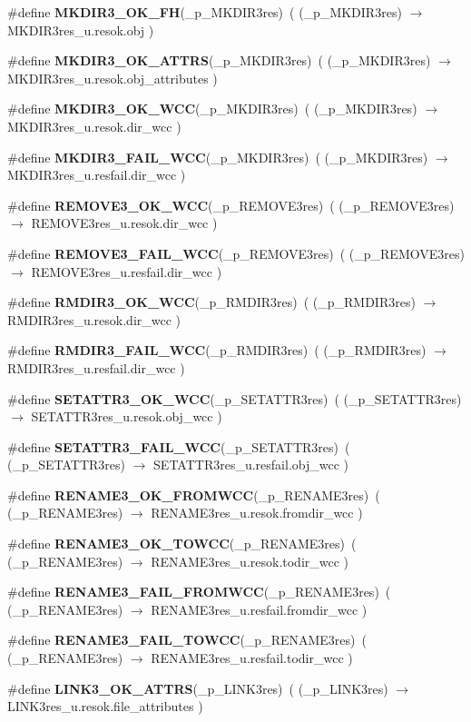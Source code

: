 \begin{CompactItemize}
\item 
\#define {\bf MKDIR3\_\-OK\_\-FH}(\_\-p\_\-MKDIR3res)\ ( (\_\-p\_\-MKDIR3res) $\rightarrow$ MKDIR3res\_\-u.resok.obj )
\item 
\#define {\bf MKDIR3\_\-OK\_\-ATTRS}(\_\-p\_\-MKDIR3res)\ ( (\_\-p\_\-MKDIR3res) $\rightarrow$ MKDIR3res\_\-u.resok.obj\_\-attributes )
\item 
\#define {\bf MKDIR3\_\-OK\_\-WCC}(\_\-p\_\-MKDIR3res)\ ( (\_\-p\_\-MKDIR3res) $\rightarrow$ MKDIR3res\_\-u.resok.dir\_\-wcc )
\item 
\#define {\bf MKDIR3\_\-FAIL\_\-WCC}(\_\-p\_\-MKDIR3res)\ ( (\_\-p\_\-MKDIR3res) $\rightarrow$ MKDIR3res\_\-u.resfail.dir\_\-wcc )
\item 
\#define {\bf REMOVE3\_\-OK\_\-WCC}(\_\-p\_\-REMOVE3res)\ ( (\_\-p\_\-REMOVE3res) $\rightarrow$ REMOVE3res\_\-u.resok.dir\_\-wcc )
\item 
\#define {\bf REMOVE3\_\-FAIL\_\-WCC}(\_\-p\_\-REMOVE3res)\ ( (\_\-p\_\-REMOVE3res) $\rightarrow$ REMOVE3res\_\-u.resfail.dir\_\-wcc )
\item 
\#define {\bf RMDIR3\_\-OK\_\-WCC}(\_\-p\_\-RMDIR3res)\ ( (\_\-p\_\-RMDIR3res) $\rightarrow$ RMDIR3res\_\-u.resok.dir\_\-wcc )
\item 
\#define {\bf RMDIR3\_\-FAIL\_\-WCC}(\_\-p\_\-RMDIR3res)\ ( (\_\-p\_\-RMDIR3res) $\rightarrow$ RMDIR3res\_\-u.resfail.dir\_\-wcc )
\item 
\#define {\bf SETATTR3\_\-OK\_\-WCC}(\_\-p\_\-SETATTR3res)\ ( (\_\-p\_\-SETATTR3res) $\rightarrow$ SETATTR3res\_\-u.resok.obj\_\-wcc )
\item 
\#define {\bf SETATTR3\_\-FAIL\_\-WCC}(\_\-p\_\-SETATTR3res)\ ( (\_\-p\_\-SETATTR3res) $\rightarrow$ SETATTR3res\_\-u.resfail.obj\_\-wcc )
\item 
\#define {\bf RENAME3\_\-OK\_\-FROMWCC}(\_\-p\_\-RENAME3res)\ ( (\_\-p\_\-RENAME3res) $\rightarrow$ RENAME3res\_\-u.resok.fromdir\_\-wcc )
\item 
\#define {\bf RENAME3\_\-OK\_\-TOWCC}(\_\-p\_\-RENAME3res)\ ( (\_\-p\_\-RENAME3res) $\rightarrow$ RENAME3res\_\-u.resok.todir\_\-wcc )
\item 
\#define {\bf RENAME3\_\-FAIL\_\-FROMWCC}(\_\-p\_\-RENAME3res)\ ( (\_\-p\_\-RENAME3res) $\rightarrow$ RENAME3res\_\-u.resfail.fromdir\_\-wcc )
\item 
\#define {\bf RENAME3\_\-FAIL\_\-TOWCC}(\_\-p\_\-RENAME3res)\ ( (\_\-p\_\-RENAME3res) $\rightarrow$ RENAME3res\_\-u.resfail.todir\_\-wcc )
\item 
\#define {\bf LINK3\_\-OK\_\-ATTRS}(\_\-p\_\-LINK3res)\ ( (\_\-p\_\-LINK3res) $\rightarrow$ LINK3res\_\-u.resok.file\_\-attributes )

\end{CompactItemize}
